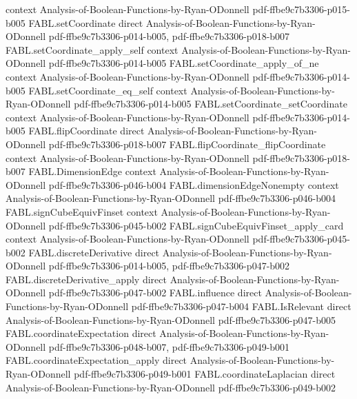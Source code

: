 \begin{theorem}
  {context}
  {Analysis-of-Boolean-Functions-by-Ryan-ODonnell}
  {pdf-ffbe9c7b3306-p015-b005}
\proofstep
  {FABL.setCoordinate}
  {direct}
  {Analysis-of-Boolean-Functions-by-Ryan-ODonnell}
  {pdf-ffbe9c7b3306-p014-b005,
    pdf-ffbe9c7b3306-p018-b007}
\proofstep
  {FABL.setCoordinate_apply_self}
  {context}
  {Analysis-of-Boolean-Functions-by-Ryan-ODonnell}
  {pdf-ffbe9c7b3306-p014-b005}
\proofstep
  {FABL.setCoordinate_apply_of_ne}
  {context}
  {Analysis-of-Boolean-Functions-by-Ryan-ODonnell}
  {pdf-ffbe9c7b3306-p014-b005}
\proofstep
  {FABL.setCoordinate_eq_self}
  {context}
  {Analysis-of-Boolean-Functions-by-Ryan-ODonnell}
  {pdf-ffbe9c7b3306-p014-b005}
\proofstep
  {FABL.setCoordinate_setCoordinate}
  {context}
  {Analysis-of-Boolean-Functions-by-Ryan-ODonnell}
  {pdf-ffbe9c7b3306-p014-b005}
\proofstep
  {FABL.flipCoordinate}
  {direct}
  {Analysis-of-Boolean-Functions-by-Ryan-ODonnell}
  {pdf-ffbe9c7b3306-p018-b007}
\proofstep
  {FABL.flipCoordinate_flipCoordinate}
  {context}
  {Analysis-of-Boolean-Functions-by-Ryan-ODonnell}
  {pdf-ffbe9c7b3306-p018-b007}
\proofstep
  {FABL.DimensionEdge}
  {context}
  {Analysis-of-Boolean-Functions-by-Ryan-ODonnell}
  {pdf-ffbe9c7b3306-p046-b004}
\proofstep
  {FABL.dimensionEdgeNonempty}
  {context}
  {Analysis-of-Boolean-Functions-by-Ryan-ODonnell}
  {pdf-ffbe9c7b3306-p046-b004}
\proofstep
  {FABL.signCubeEquivFinset}
  {context}
  {Analysis-of-Boolean-Functions-by-Ryan-ODonnell}
  {pdf-ffbe9c7b3306-p045-b002}
\proofstep
  {FABL.signCubeEquivFinset_apply_card}
  {context}
  {Analysis-of-Boolean-Functions-by-Ryan-ODonnell}
  {pdf-ffbe9c7b3306-p045-b002}
\proofstep
  {FABL.discreteDerivative}
  {direct}
  {Analysis-of-Boolean-Functions-by-Ryan-ODonnell}
  {pdf-ffbe9c7b3306-p014-b005,
    pdf-ffbe9c7b3306-p047-b002}
\proofstep
  {FABL.discreteDerivative_apply}
  {direct}
  {Analysis-of-Boolean-Functions-by-Ryan-ODonnell}
  {pdf-ffbe9c7b3306-p047-b002}
\proofstep
  {FABL.influence}
  {direct}
  {Analysis-of-Boolean-Functions-by-Ryan-ODonnell}
  {pdf-ffbe9c7b3306-p047-b004}
\proofstep
  {FABL.IsRelevant}
  {direct}
  {Analysis-of-Boolean-Functions-by-Ryan-ODonnell}
  {pdf-ffbe9c7b3306-p047-b005}
\proofstep
  {FABL.coordinateExpectation}
  {direct}
  {Analysis-of-Boolean-Functions-by-Ryan-ODonnell}
  {pdf-ffbe9c7b3306-p048-b007,
    pdf-ffbe9c7b3306-p049-b001}
\proofstep
  {FABL.coordinateExpectation_apply}
  {direct}
  {Analysis-of-Boolean-Functions-by-Ryan-ODonnell}
  {pdf-ffbe9c7b3306-p049-b001}
\proofstep
  {FABL.coordinateLaplacian}
  {direct}
  {Analysis-of-Boolean-Functions-by-Ryan-ODonnell}
  {pdf-ffbe9c7b3306-p049-b002}

\end{theorem}
